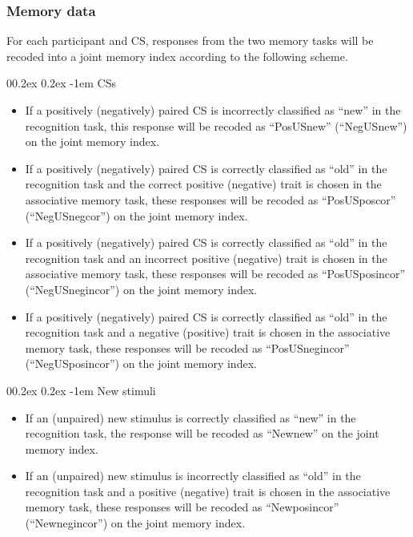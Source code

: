 \documentclass[
  doc,floatsintext]{apa6}
\makeatletter
\let\oldparagraph\paragraph
\renewcommand{\paragraph}{
    \@ifstar
      \xxxParagraphStar
      \xxxParagraphNoStar
  }
\newcommand{\xxxParagraphStar}[1]{\oldparagraph*{#1}\mbox{}}
\newcommand{\xxxParagraphNoStar}[1]{\oldparagraph{#1}\mbox{}}
\renewcommand{\paragraph}{\@startsection{paragraph}{4}{\parindent}%
  {0\baselineskip \@plus 0.2ex \@minus 0.2ex}%
  {-1em}%
  {\normalfont\normalsize\bfseries\itshape\typesectitle}}
\makeatother
\begin{document}
\subsubsection{Memory data}\label{memory-data}

For each participant and CS, responses from the two memory tasks will be recoded into a joint memory index according to the following scheme.

\paragraph{CSs}\label{css}

\begin{itemize}
\item
  If a positively (negatively) paired CS is incorrectly classified as ``new'' in the recognition task, this response will be recoded as ``PosUSnew'' (``NegUSnew'') on the joint memory index.
\item
  If a positively (negatively) paired CS is correctly classified as ``old'' in the recognition task and the correct positive (negative) trait is chosen in the associative memory task, these responses will be recoded as ``PosUSposcor'' (``NegUSnegcor'') on the joint memory index.
\item
  If a positively (negatively) paired CS is correctly classified as ``old'' in the recognition task and an incorrect positive (negative) trait is chosen in the associative memory task, these responses will be recoded as ``PosUSposincor'' (``NegUSnegincor'') on the joint memory index.
\item
  If a positively (negatively) paired CS is correctly classified as ``old'' in the recognition task and a negative (positive) trait is chosen in the associative memory task, these responses will be recoded as ``PosUSnegincor'' (``NegUSposincor'') on the joint memory index.
\end{itemize}

\paragraph{New stimuli}\label{new-stimuli}

\begin{itemize}
\item
  If an (unpaired) new stimulus is correctly classified as ``new'' in the recognition task, the response will be recoded as ``Newnew'' on the joint memory index.
\item
  If an (unpaired) new stimulus is incorrectly classified as ``old'' in the recognition task and a positive (negative) trait is chosen in the associative memory task, these responses will be recoded as ``Newposincor'' (``Newnegincor'') on the joint memory index.
\end{itemize}
\end{document}
